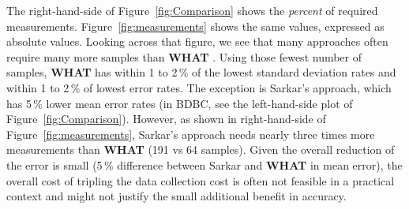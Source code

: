 \documentclass{newsig}
\newcommand{\bi}{\begin{itemize}}%
\newcommand{\ei}{\end{itemize}}
\newcommand{\fig}[1]{Figure~\ref{fig:#1}}
\newcommand{\what}{{\bf WHAT }}
\begin{document}
The right-hand-side of Figure~\ref{fig:Comparison}   shows
the {\em percent} of required measurements. Figure~\ref{fig:measurements} shows the same values,
expressed as absolute values. Looking across that figure,
we see that many approaches often require many more samples than
\what.  Using those fewest number of samples, \what has
within 1 to 2\,\% of the lowest standard deviation rates 
and within 1 to 2\,\% of lowest error rates.
The exception is Sarkar's approach, which has 5\,\% lower mean error
rates (in BDBC, see the left-hand-side plot of Figure~\ref{fig:Comparison}).  However, 
as shown in right-hand-side of Figure~\ref{fig:measurements}, Sarkar's approach needs nearly three times
more measurements than \what (191 vs 64 samples). Given
the overall reduction of the error is   small (5\,\% difference
between Sarkar and \what in mean error), the overall
cost of tripling the data collection cost is
often not feasible in a practical context and might not justify the small additional benefit in accuracy. 


    






% 

% 

% 

% 



\end{document}
